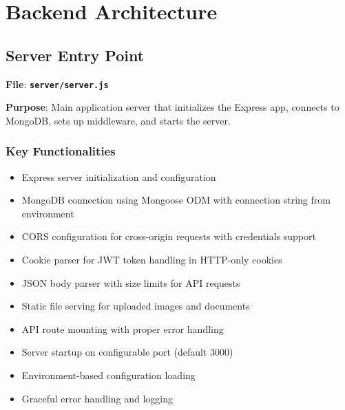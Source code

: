 \documentclass[12pt,a4paper]{article}
\newcommand{\file}[1]{\textbf{\texttt{#1}}}
\begin{document}
\section{Backend Architecture}
\label{sec:backend-architecture}

\subsection{Server Entry Point}
\label{subsec:server-entry-point}

\textbf{File}: \file{server/server.js}

\textbf{Purpose}: Main application server that initializes the Express app, connects to MongoDB, sets up middleware, and starts the server.

\subsubsection{Key Functionalities}
\begin{itemize}
\item Express server initialization and configuration
\item MongoDB connection using Mongoose ODM with connection string from environment
\item CORS configuration for cross-origin requests with credentials support
\item Cookie parser for JWT token handling in HTTP-only cookies
\item JSON body parser with size limits for API requests
\item Static file serving for uploaded images and documents
\item API route mounting with proper error handling
\item Server startup on configurable port (default 3000)
\item Environment-based configuration loading
\item Graceful error handling and logging
\end{itemize}
\end{document}
